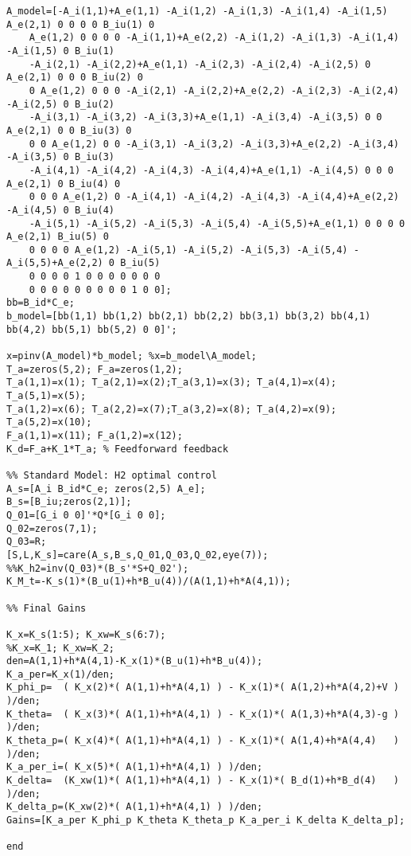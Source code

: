 \begin{lstlisting}[style=codematlab]
%% Solving Sylvester Equations Manually
A_model=[-A_i(1,1)+A_e(1,1) -A_i(1,2) -A_i(1,3) -A_i(1,4) -A_i(1,5) A_e(2,1) 0 0 0 0 B_iu(1) 0
    A_e(1,2) 0 0 0 0 -A_i(1,1)+A_e(2,2) -A_i(1,2) -A_i(1,3) -A_i(1,4) -A_i(1,5) 0 B_iu(1)
    -A_i(2,1) -A_i(2,2)+A_e(1,1) -A_i(2,3) -A_i(2,4) -A_i(2,5) 0 A_e(2,1) 0 0 0 B_iu(2) 0
    0 A_e(1,2) 0 0 0 -A_i(2,1) -A_i(2,2)+A_e(2,2) -A_i(2,3) -A_i(2,4) -A_i(2,5) 0 B_iu(2)
    -A_i(3,1) -A_i(3,2) -A_i(3,3)+A_e(1,1) -A_i(3,4) -A_i(3,5) 0 0 A_e(2,1) 0 0 B_iu(3) 0
    0 0 A_e(1,2) 0 0 -A_i(3,1) -A_i(3,2) -A_i(3,3)+A_e(2,2) -A_i(3,4) -A_i(3,5) 0 B_iu(3)
    -A_i(4,1) -A_i(4,2) -A_i(4,3) -A_i(4,4)+A_e(1,1) -A_i(4,5) 0 0 0 A_e(2,1) 0 B_iu(4) 0
    0 0 0 A_e(1,2) 0 -A_i(4,1) -A_i(4,2) -A_i(4,3) -A_i(4,4)+A_e(2,2) -A_i(4,5) 0 B_iu(4)
    -A_i(5,1) -A_i(5,2) -A_i(5,3) -A_i(5,4) -A_i(5,5)+A_e(1,1) 0 0 0 0 A_e(2,1) B_iu(5) 0
    0 0 0 0 A_e(1,2) -A_i(5,1) -A_i(5,2) -A_i(5,3) -A_i(5,4) -A_i(5,5)+A_e(2,2) 0 B_iu(5)
    0 0 0 0 1 0 0 0 0 0 0 0
    0 0 0 0 0 0 0 0 0 1 0 0];
bb=B_id*C_e;
b_model=[bb(1,1) bb(1,2) bb(2,1) bb(2,2) bb(3,1) bb(3,2) bb(4,1) bb(4,2) bb(5,1) bb(5,2) 0 0]';

x=pinv(A_model)*b_model; %x=b_model\A_model;
T_a=zeros(5,2); F_a=zeros(1,2);
T_a(1,1)=x(1); T_a(2,1)=x(2);T_a(3,1)=x(3); T_a(4,1)=x(4); T_a(5,1)=x(5);
T_a(1,2)=x(6); T_a(2,2)=x(7);T_a(3,2)=x(8); T_a(4,2)=x(9); T_a(5,2)=x(10);
F_a(1,1)=x(11); F_a(1,2)=x(12);
K_d=F_a+K_1*T_a; % Feedforward feedback

%% Standard Model: H2 optimal control
A_s=[A_i B_id*C_e; zeros(2,5) A_e];
B_s=[B_iu;zeros(2,1)];
Q_01=[G_i 0 0]'*Q*[G_i 0 0];
Q_02=zeros(7,1);
Q_03=R;
[S,L,K_s]=care(A_s,B_s,Q_01,Q_03,Q_02,eye(7));
%%K_h2=inv(Q_03)*(B_s'*S+Q_02');
K_M_t=-K_s(1)*(B_u(1)+h*B_u(4))/(A(1,1)+h*A(4,1));

%% Final Gains

K_x=K_s(1:5); K_xw=K_s(6:7);
%K_x=K_1; K_xw=K_2;
den=A(1,1)+h*A(4,1)-K_x(1)*(B_u(1)+h*B_u(4));
K_a_per=K_x(1)/den;
K_phi_p=  ( K_x(2)*( A(1,1)+h*A(4,1) ) - K_x(1)*( A(1,2)+h*A(4,2)+V ) )/den;
K_theta=  ( K_x(3)*( A(1,1)+h*A(4,1) ) - K_x(1)*( A(1,3)+h*A(4,3)-g ) )/den;
K_theta_p=( K_x(4)*( A(1,1)+h*A(4,1) ) - K_x(1)*( A(1,4)+h*A(4,4)   ) )/den;
K_a_per_i=( K_x(5)*( A(1,1)+h*A(4,1) ) )/den;
K_delta=  (K_xw(1)*( A(1,1)+h*A(4,1) ) - K_x(1)*( B_d(1)+h*B_d(4)   ) )/den;
K_delta_p=(K_xw(2)*( A(1,1)+h*A(4,1) ) )/den;
Gains=[K_a_per K_phi_p K_theta K_theta_p K_a_per_i K_delta K_delta_p];

end
\end{lstlisting}

